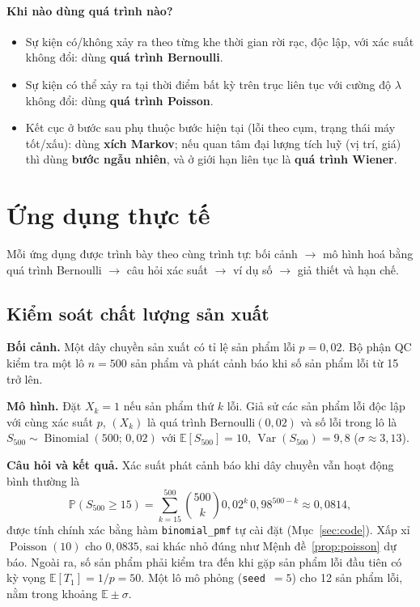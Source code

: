 \documentclass[12pt,a4paper]{article}
\theoremstyle{definition}
\theoremstyle{remark}
\newcommand{\Prob}{\mathbb{P}}
\newcommand{\E}{\mathbb{E}}
\newcommand{\Var}{\operatorname{Var}}
\newcommand{\Bin}{\operatorname{Binomial}}
\newcommand{\Pois}{\operatorname{Poisson}}
\begin{document}
\paragraph{Khi nào dùng quá trình nào?}
\begin{itemize}
  \item Sự kiện có/không xảy ra theo từng khe thời gian rời rạc, độc lập, với xác suất không đổi: dùng
        \textbf{quá trình Bernoulli}.
  \item Sự kiện có thể xảy ra tại thời điểm bất kỳ trên trục liên tục với cường độ $\lambda$ không đổi: dùng
        \textbf{quá trình Poisson}.
  \item Kết cục ở bước sau phụ thuộc bước hiện tại (lỗi theo cụm, trạng thái máy tốt/xấu): dùng
        \textbf{xích Markov}; nếu quan tâm đại lượng tích luỹ (vị trí, giá) thì dùng \textbf{bước ngẫu nhiên},
        và ở giới hạn liên tục là \textbf{quá trình Wiener}.
\end{itemize}

\section{Ứng dụng thực tế}\label{sec:app}
Mỗi ứng dụng được trình bày theo cùng trình tự: bối cảnh $\to$ mô hình hoá bằng quá trình Bernoulli $\to$ câu hỏi
xác suất $\to$ ví dụ số $\to$ giả thiết và hạn chế.

\subsection{Kiểm soát chất lượng sản xuất}\label{sec:app-qc}
\textbf{Bối cảnh.} Một dây chuyền sản xuất có tỉ lệ sản phẩm lỗi $p = 0{,}02$. Bộ phận QC kiểm tra một lô
$n = 500$ sản phẩm và phát cảnh báo khi số sản phẩm lỗi từ 15 trở lên.

\textbf{Mô hình.} Đặt $X_k = 1$ nếu sản phẩm thứ $k$ lỗi. Giả sử các sản phẩm lỗi độc lập với cùng xác suất
$p$, $(X_k)$ là quá trình Bernoulli$(0{,}02)$ và số lỗi trong lô là
$S_{500}\sim\Bin(500;\,0{,}02)$ với $\E[S_{500}] = 10$, $\Var(S_{500}) = 9{,}8$ ($\sigma\approx3{,}13$).

\textbf{Câu hỏi và kết quả.} Xác suất phát cảnh báo khi dây chuyền vẫn hoạt động bình thường là
\begin{equation}\label{eq:qc}
  \Prob(S_{500} \ge 15) = \sum_{k=15}^{500}\binom{500}{k}0{,}02^k\,0{,}98^{500-k} \approx 0{,}0814,
\end{equation}
được tính chính xác bằng hàm \texttt{binomial\_pmf} tự cài đặt (Mục~\ref{sec:code}). Xấp xỉ
$\Pois(10)$ cho $0{,}0835$, sai khác nhỏ đúng như Mệnh đề~\ref{prop:poisson} dự báo. Ngoài ra, số sản phẩm phải
kiểm tra đến khi gặp sản phẩm lỗi đầu tiên có kỳ vọng $\E[T_1] = 1/p = 50$. Một lô mô phỏng
(\texttt{seed}~$=5$) cho 12 sản phẩm lỗi, nằm trong khoảng $\E\pm\sigma$.
\end{document}
